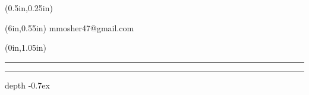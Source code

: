 \newcommand{\Email}{mmosher47@gmail.com}
\newcommand{\Phone}{616.965.1544}
\newcommand{\resline}[1]{%
   \begin{textblock*}{\paperwidth}(0in,{#1})
      \noindent{\rule[0.55ex]{0.5in}{0.4pt}}%
      \rule[1.5pt]{3.82in}{3pt}%
      {\leavevmode\leaders\hrule height 0.7ex depth \dimexpr0.4pt-0.7ex\hfill\kern0pt}
   \end{textblock*}
}

\begin{textblock*}{3.75in}(0.5in,0.25in)
\noindent\colorbox{black}{%
   \color{white}%
}
\color{black}
\end{textblock*}
\begin{textblock*}{2.25in}(6in,0.55in) %
\flushright
\Email\par
\end{textblock*}
\resline{1.05in}
